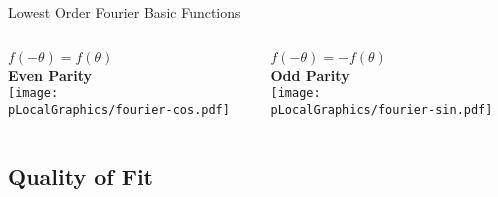 \begin{frame}{Lowest Order Fourier Basic Functions}
    \centering
    \begin{columns}[c] %
        \begin{column}{0.5\textwidth}
            \centering
            $f(-\theta) = f(\theta)$  \\[0.5em]
            \textbf{Even Parity} \\[0.5em]
            \texttt{[image: \\pLocalGraphics/fourier-cos.pdf]}
        \end{column}

        \begin{column}{0.5\textwidth}
            \centering
            $f(-\theta) = -f(\theta)$  \\[0.5em]
            \textbf{Odd Parity} \\[0.5em]
            \texttt{[image: \\pLocalGraphics/fourier-sin.pdf]}
        \end{column}
    \end{columns}
\end{frame}

	
	


\subsection{Quality of Fit}

\endinput  %
